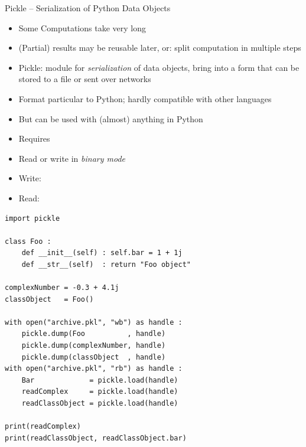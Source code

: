 \begin{frame}[fragile]{Pickle -- Serialization of Python Data Objects}
%
\begin{itemize}
\item Some Computations take very long
\item (Partial) results may be reusable later, or: split computation in multiple steps
\item Pickle: module for \emph{serialization} of data objects, \ie bring into a form that can be stored to a file or sent over networks
\item Format particular to Python; hardly compatible with other languages
\item But can be used with (almost) anything in Python
\item Requires 
\item Read or write in \emph{binary mode}
\item Write: 
\item Read: 
\end{itemize}
%
\end{frame}


\begin{frame}[fragile]
%
\vspace{-5pt}
\begin{codebox}
\begin{verbatim}
import pickle

class Foo :
    def __init__(self) : self.bar = 1 + 1j
    def __str__(self)  : return "Foo object"

complexNumber = -0.3 + 4.1j
classObject   = Foo()

with open("archive.pkl", "wb") as handle :
    pickle.dump(Foo          , handle)
    pickle.dump(complexNumber, handle)
    pickle.dump(classObject  , handle)
with open("archive.pkl", "rb") as handle :
    Bar             = pickle.load(handle)
    readComplex     = pickle.load(handle)
    readClassObject = pickle.load(handle)

print(readComplex)
print(readClassObject, readClassObject.bar)
\end{verbatim}
\end{codebox}
%
\end{frame}


